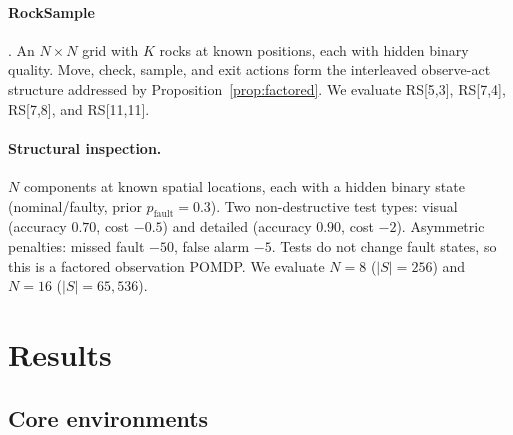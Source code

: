 \documentclass[runningheads]{llncs}
\begin{document}
\paragraph{RockSample} \citep{smith2004}. An $N{\times}N$ grid with $K$ rocks at known positions, each with hidden binary quality. Move, check, sample, and exit actions form the interleaved observe-act structure addressed by Proposition~\ref{prop:factored}. We evaluate RS[5,3], RS[7,4], RS[7,8], and RS[11,11].

\paragraph{Structural inspection.} $N$ components at known spatial locations, each with a hidden binary state (nominal/faulty, prior $p_{\text{fault}}{=}0.3$). Two non-destructive test types: visual (accuracy $0.70$, cost $-0.5$) and detailed (accuracy $0.90$, cost $-2$). Asymmetric penalties: missed fault $-50$, false alarm $-5$. Tests do not change fault states, so this is a factored observation POMDP. We evaluate $N{=}8$ ($|S|{=}256$) and $N{=}16$ ($|S|{=}65{,}536$).

\section{Results}

\subsection{Core environments}
\end{document}

